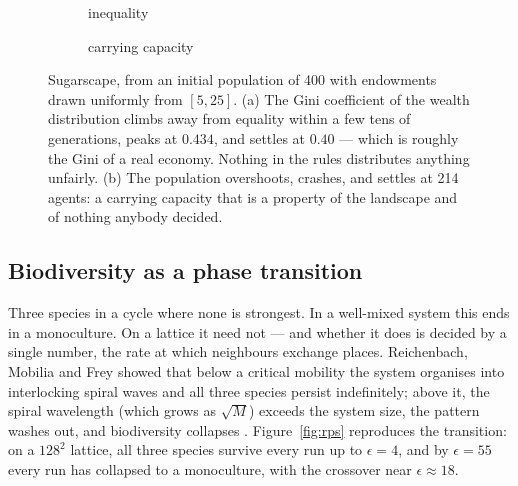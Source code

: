 \documentclass[11pt,a4paper]{article}
\begin{document}
\begin{figure}[t]
\centering
\begin{subfigure}[b]{0.48\textwidth}
\caption{inequality}
\end{subfigure}\hfill
\begin{subfigure}[b]{0.48\textwidth}
\caption{carrying capacity}
\end{subfigure}
\caption{Sugarscape, from an initial population of 400 with endowments drawn
uniformly from $[5,25]$. (a) The Gini coefficient of the wealth distribution
climbs away from equality within a few tens of generations, peaks at
$\num{0.434}$, and settles at $\num{0.40}$ --- which is roughly the Gini of a
real economy. Nothing in the rules distributes anything unfairly. (b) The
population overshoots, crashes, and settles at 214 agents: a carrying capacity
that is a property of the landscape and of nothing anybody decided.}
\label{fig:sugar}
\end{figure}

\subsection{Biodiversity as a phase transition}

Three species in a cycle where none is strongest. In a well-mixed system this
ends in a monoculture. On a lattice it need not --- and whether it does is
decided by a single number, the rate at which neighbours exchange places.
Reichenbach, Mobilia and Frey showed that below a critical mobility the system
organises into interlocking spiral waves and all three species persist
indefinitely; above it, the spiral wavelength (which grows as $\sqrt{M}$) exceeds
the system size, the pattern washes out, and biodiversity collapses
\cite{reichenbach2007}. Figure~\ref{fig:rps} reproduces the transition: on a
$128^2$ lattice, all three species survive every run up to $\epsilon=4$, and by
$\epsilon=55$ every run has collapsed to a monoculture, with the crossover near
$\epsilon\approx\num{18}$.
\end{document}

